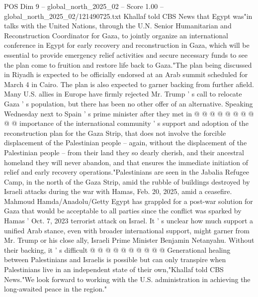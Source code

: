 \begin{textsample}{POS Dim 9 – global\_north\_2025\_02 – Score 1.00 – global\_north\_2025\_02/121490725.txt}
Khallaf told CBS News that Egypt was"in talks with the United Nations, through the U.N.
Senior Humanitarian and Reconstruction Coordinator for Gaza, to jointly organize an international conference in Egypt for early recovery and reconstruction in Gaza, which will be essential to provide emergency relief activities and secure necessary funds to see the plan come to fruition and restore life back to Gaza."The plan being discussed in Riyadh is expected to be officially endorsed at an Arab summit scheduled for March 4 in Cairo.
The plan is also expected to garner backing from further afield.
Many U.S. allies in Europe have firmly rejected Mr.
Trump ' s call to relocate Gaza ' s population, but there has been no other offer of an alternative.
Speaking Wednesday next to Spain ' s prime minister after they met in @ @ @ @ @ @ @ @ @ @ importance of the international community ' s support and adoption of the reconstruction plan for the Gaza Strip, that does not involve the forcible displacement of the Palestinian people -- again, without the displacement of the Palestinian people -- from their land they so dearly cherish, and their ancestral homeland they will never abandon, and that ensures the immediate initiation of relief and early recovery operations."Palestinians are seen in the Jabalia Refugee Camp, in the north of the Gaza Strip, amid the rubble of buildings destroyed by Israeli attacks during the war with Hamas, Feb. 20, 2025, amid a ceasefire.
Mahmoud Hamda/Anadolu/Getty Egypt has grappled for a post-war solution for Gaza that would be acceptable to all parties since the conflict was sparked by Hamas ' Oct. 7, 2023 terrorist attack on Israel.
It ' s unclear how much support a unified Arab stance, even with broader international support, might garner from Mr.
Trump or his close ally, Israeli Prime Minister Benjamin Netanyahu.
Without their backing, it ' s difficult @ @ @ @ @ @ @ @ @ @ Generational healing between Palestinians and Israelis is possible but can only transpire when Palestinians live in an independent state of their own,"Khallaf told CBS News."We look forward to working with the U.S. administration in achieving the long-awaited peace in the region."

\end{textsample}
